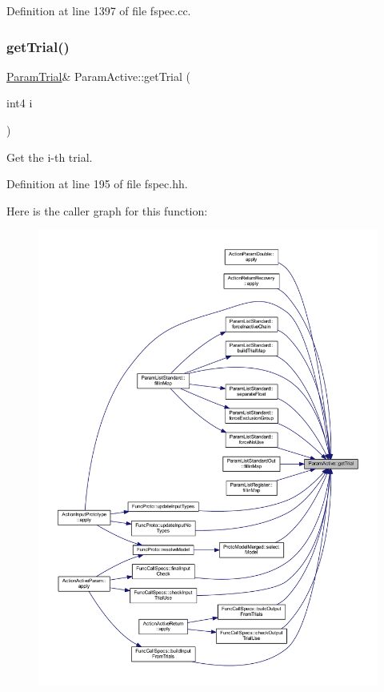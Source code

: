 Definition at line 1397 of file fspec.\+cc.

\mbox{\label{class_param_active_a88fb46565155de0123b634951a186f74}} 
\subsubsection{\texorpdfstring{getTrial()}{getTrial()}}
{\footnotesize\ttfamily \mbox{\hyperlink{class_param_trial}{Param\+Trial}}\& Param\+Active\+::get\+Trial (\begin{DoxyParamCaption}\item[{int4}]{i }\end{DoxyParamCaption})\hspace{0.3cm}{\ttfamily [inline]}}



Get the i-\/th trial. 



Definition at line 195 of file fspec.\+hh.

Here is the caller graph for this function\+:
\nopagebreak
\begin{figure}[H]
\begin{center}
\leavevmode
\includegraphics[width=350pt]{class_param_active_a88fb46565155de0123b634951a186f74_icgraph}
\end{center}
\end{figure}
\mbox{\label{class_param_active_a4ce9f8640c32eb48df409ff71a6e15eb}} 
